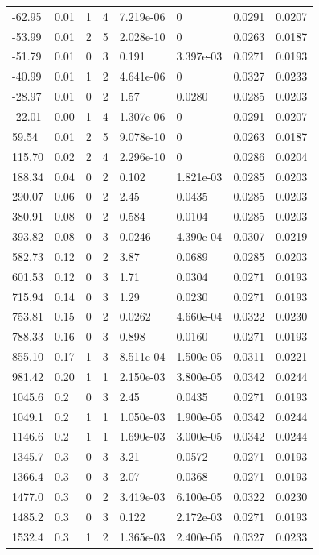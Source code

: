 \documentclass[preview]{standalone}
\begin{document}
{{\begin{tabular}{L{1.2cm}C{1.2cm} C{0.3cm}C{0.5cm} C{1.4cm}C{1.4cm} C{1.4cm}C{1.4cm}}
  -62.95  &  0.01  & 1     &  4 &  7.219e-06  & 0  & 0.0291 &  0.0207   \\ 
  -53.99  &  0.01  & 2     &  5 &  2.028e-10  & 0  & 0.0263 &  0.0187   \\ 
  -51.79  &  0.01  & 0     &  3 &  0.191  & 3.397e-03  & 0.0271 &  0.0193   \\ 
  -40.99  &  0.01  & 1     &  2 &  4.641e-06  & 0  & 0.0327 &  0.0233   \\ 
  -28.97  &  0.01  & 0     &  2 &  1.57  & 0.0280  & 0.0285 &  0.0203   \\ 
  -22.01  &  0.00  & 1     &  4 &  1.307e-06  & 0  & 0.0291 &  0.0207   \\ 
  59.54  &  0.01  & 2     &  5 &  9.078e-10  & 0  & 0.0263 &  0.0187   \\ 
  115.70  &  0.02  & 2     &  4 &  2.296e-10  & 0  & 0.0286 &  0.0204   \\ 
  188.34  &  0.04  & 0     &  2 &  0.102  & 1.821e-03  & 0.0285 &  0.0203   \\ 
  290.07  &  0.06  & 0     &  2 &  2.45  & 0.0435  & 0.0285 &  0.0203   \\ 
  380.91  &  0.08  & 0     &  2 &  0.584  & 0.0104  & 0.0285 &  0.0203   \\ 
  393.82  &  0.08  & 0     &  3 &  0.0246  & 4.390e-04  & 0.0307 &  0.0219   \\ 
  582.73  &  0.12  & 0     &  2 &  3.87  & 0.0689  & 0.0285 &  0.0203   \\ 
  601.53  &  0.12  & 0     &  3 &  1.71  & 0.0304  & 0.0271 &  0.0193   \\ 
  715.94  &  0.14  & 0     &  3 &  1.29  & 0.0230  & 0.0271 &  0.0193   \\ 
  753.81  &  0.15  & 0     &  2 &  0.0262  & 4.660e-04  & 0.0322 &  0.0230   \\ 
  788.33  &  0.16  & 0     &  3 &  0.898  & 0.0160  & 0.0271 &  0.0193   \\ 
  855.10  &  0.17  & 1     &  3 &  8.511e-04  & 1.500e-05  & 0.0311 &  0.0221   \\ 
  981.42  &  0.20  & 1     &  1 &  2.150e-03  & 3.800e-05  & 0.0342 &  0.0244   \\ 
  1045.6  &   0.2  & 0     &  3 &  2.45  & 0.0435  & 0.0271 &  0.0193   \\ 
  1049.1  &   0.2  & 1     &  1 &  1.050e-03  & 1.900e-05  & 0.0342 &  0.0244   \\ 
  1146.6  &   0.2  & 1     &  1 &  1.690e-03  & 3.000e-05  & 0.0342 &  0.0244   \\ 
  1345.7  &   0.3  & 0     &  3 &  3.21  & 0.0572  & 0.0271 &  0.0193   \\ 
  1366.4  &   0.3  & 0     &  3 &  2.07  & 0.0368  & 0.0271 &  0.0193   \\ 
  1477.0  &   0.3  & 0     &  2 &  3.419e-03  & 6.100e-05  & 0.0322 &  0.0230   \\ 
  1485.2  &   0.3  & 0     &  3 &  0.122  & 2.172e-03  & 0.0271 &  0.0193   \\ 
  1532.4  &   0.3  & 1     &  2 &  1.365e-03  & 2.400e-05  & 0.0327 &  0.0233   \\ 
\hline 
\end{tabular} 

}}
\end{document}
